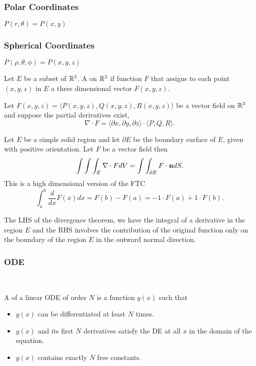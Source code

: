 \documentclass[class=article,crop=false]{standalone}
\begin{document}
\subsubsection{Polar Coordinates}
$P(r,\theta)=P(x,y)$
\subsubsection{Spherical Coordinates}
$P(\rho,\theta,\phi)=P(x,y,z)$\\

\begin{defn}
	Let $E$ be a subset of $\mathbb{R}^3$. A  on $\mathbb{R}^3$ if function $F$ that assigns to each point  $(x,y,z)$ in $E$ a three dimensional vector $F(x,y,z)$.
\end{defn}
\begin{defn}[Divergence]
	Let $F(x,y,z)=\langle P(x,y,z),Q(x,y,z),R(x,y,z) \rangle$ be a vector field on $\mathbb{R}^3$ and suppose the partial derivatives exist,
	\[
		\nabla \cdot F = \langle \partial x, \partial y, \partial z \rangle \cdot \langle P,Q,R \rangle
	.\] 
\end{defn}
\begin{thm}
	Let $E$ be a simple solid region and let $\partial E$ be the boundary surface of $E$, given with positive orientation. Let $F$ be a vector field then
	 \[
		 \int \int \int_E \nabla \cdot F dV = \int \int_{\partial E} F \cdot {\boldmath\textbf{n}} dS 
	.\]
	This is a high dimensional version of the FTC
	\[
		\int_{ a}^{ b} \frac{d}{dx} F(x) dx = F(b) - F(a) = -1 \cdot F(a) + 1 \cdot F(b) 
	.\] 
\end{thm}
\begin{note}[]
The LHS of the divergence theorem, we have the integral of a derivative in the region $E$ and the RHS involves the contribution of the original function only on the boundary of the region $E$ in the outward normal direction.
\end{note}

\subsubsection{ODE}
\\
\begin{defn}
	A  of a linear ODE of order $N$ is a function  $y(x)$ such that
	 \begin{itemize}
		 \item $y(x)$ can be differentiated at least  $N$ times.
		 \item  $y(x)$ and its first  $N$ derivatives satisfy the DE at all  $x$ in the domain of the equation.
		 \item $y(x)$ contains exactly $N$ free constants. 
	\end{itemize}
\end{defn}
\end{document}
